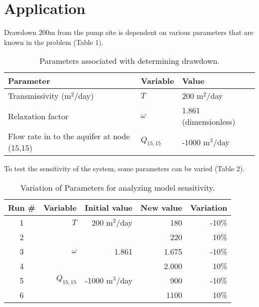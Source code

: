 \documentclass[titlepage,11pt]{article}
\begin{document}
\newpage
\section{Application}

Drawdown 200m from the pump site is dependent on various parameters
that are known in the problem (Table 1).
\begin{table}[h]\label{tbl:param}
\begin{center}
\caption{Parameters associated with determining drawdown.}
\begin{tabular}{|l|l|l|}
\hline
{\bf Parameter}             & {\bf Variable} & {\bf Value} \\
\hline
Transmissivity (m$^2$/day) & $T$            &    200 m$^2$/day \\
\hline
Relaxation factor&      $\omega$ &  1.861 (dimensionless) \\
\hline
Flow rate in to the aquifer at node (15,15)  & $Q_{15,15}$  & -1000 m$^3$/day\\
\hline
\end{tabular}
\end{center}
\end{table}

\noindent To test the sensitivity of the system, some parameters can
be varied (Table 2).

\begin{table}[!h]
\begin{center}
\caption{Variation of Parameters for analyzing model sensitivity.}
\begin{tabular}{|c|r|r|r|r|}
\hline
{\bf Run \#}& {\bf Variable}     &{\bf Initial value} & {\bf New value}   & {\bf Variation} \\
\hline
          1 &    $T$             &   200 m$^2$/day    &       180         &  -10\% \\
          2 &                    &                    &       220         &   10\% \\
 \hline
          3 &    $\omega$        &        1.861       &         1.675     &  -10\% \\
          4 &                    &                    &        2.000      &   10\% \\
 \hline
          5 &    $Q_{15,15}$     &   -1000 m$^3$/day  &      900          &  -10\% \\
          6 &                    &                    &       1100        &   10\% \\
\hline
\end{tabular}
\end{center}
\end{table}
\end{document}
